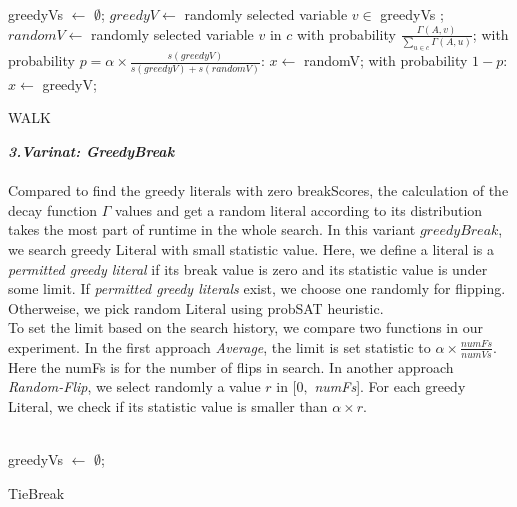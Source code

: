 \documentclass[12pt,a4paper,twoside]{scrartcl}
\numberwithin{equation}{section}
\begin{document}
\begin{algorithm}[H]
 greedyVs $\leftarrow$ $\emptyset$;\;
  $greedyV \leftarrow$   randomly selected variable $v \in$ greedyVs  ; \;
  $randomV \leftarrow$ randomly selected  variable $v$ in $c$ with probability $\frac{\Gamma(A,v)}{\sum_{u \in c}\Gamma(A,u)}$;  \;
  with probability $p = \alpha \times \frac{s(greedyV)}{s(greedyV)+s(randomV)}$: $x\leftarrow$ randomV;\;
    with probability $1-p$: $x\leftarrow$ greedyV;\;
\caption{WALK}
\end{algorithm} 
\clearpage
 \emph{\textbf{3.Varinat: GreedyBreak}}\\
\\  Compared to find the greedy literals with zero breakScores, the calculation of the decay function $\Gamma$ values and get a random literal according to its distribution takes the most part of runtime in the whole search. In this variant $greedyBreak$, we search greedy Literal with small statistic value. Here, we define a literal is a \emph{permitted greedy literal} if its break value is zero and its statistic value is under some limit. If \emph{permitted greedy literals} exist, we choose one randomly for flipping. Otherweise, we pick random Literal using probSAT heuristic.\\ To set the limit based on the search history, we compare two functions in our experiment. In the first approach \emph{Average}, the limit is set statistic to $\alpha \times \frac{numFs}{numVs}$. Here the numFs is for the number of flips in search. In another approach \emph{Random-Flip}, we select randomly a value $r $ in $[0,$  \emph{numFs}]. For each greedy Literal, we check if its statistic value is smaller than $\alpha \times r$. \\
\\
\begin{algorithm}[H]
  greedyVs $\leftarrow$ $\emptyset$;\;
  \;
\caption{TieBreak}
\end{algorithm} 
\end{document}
